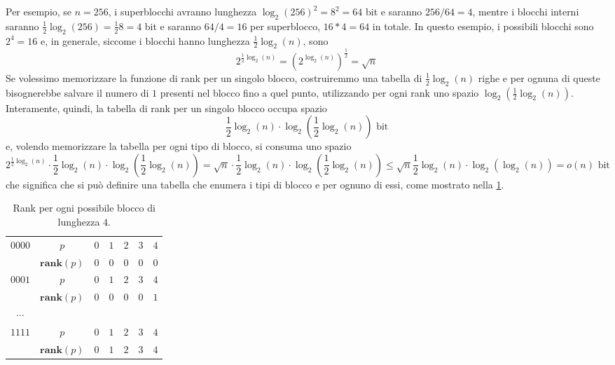 Per esempio, se $n = 256$, i superblocchi avranno lunghezza
$\log_2(256)^2 = 8^2 = 64$ bit e saranno $256/64 = 4$, mentre i
blocchi interni saranno $\frac{1}{2}\log_2(256) = \frac{1}{2}8 = 4$ bit e saranno
$64/4 = 16$ per superblocco, $16*4 = 64$ in totale.
In questo esempio, i possibili blocchi sono $2^4 = 16$ e, in generale,
siccome i blocchi hanno lunghezza $\frac{1}{2} \log_2(n)$, sono
$$
	2^{\frac{1}{2}\log_2(n)} = (2^{\log_2(n)})^{\frac{1}{2}} =  \sqrt{n}
$$
Se volessimo memorizzare la funzione di rank per un singolo blocco,
costruiremmo una tabella di $\frac{1}{2}\log_2(n)$ righe e per ognuna
di queste bisognerebbe salvare il numero di $1$ presenti nel blocco fino a quel punto,
utilizzando per ogni rank uno spazio $\log_2(\frac{1}{2}\log_2(n))$. Interamente, quindi,
la tabella di rank per un singolo blocco occupa spazio
$$
	\frac{1}{2}\log_2(n) \cdot \log_2(\frac{1}{2}\log_2(n)) \text{ bit}
$$
e, volendo memorizzare la tabella per ogni tipo di blocco, si consuma uno spazio
$$
	2^{\frac{1}{2}\log_2(n)} \cdot \frac{1}{2}\log_2(n) \cdot \log_2(\frac{1}{2}\log_2(n)) = \sqrt{n} \cdot \frac{1}{2}\log_2(n) \cdot \log_2(\frac{1}{2}\log_2(n))
	\leq \sqrt{n} \frac{1}{2}\log_2(n) \cdot \log_2(\log_2(n)) = o(n) \text{ bit}
$$
che significa che si può definire una tabella che enumera i tipi di blocco e per ognuno di
essi, come mostrato nella \cref{table:example_rank_block4}.

\begin{table}[!ht]
	\centering
	\begin{tabular}{|c|c|c|c|c|c|c|}
		\hline
		\multirow{2}{*}{$0000$} & $p$                & $0$ & $1$ & $2$ & $3$ & $4$ \\ \cline{2-7}
		                        & $\mathbf{rank}(p)$ & $0$ & $0$ & $0$ & $0$ & $0$ \\ \hline
		\multirow{2}{*}{$0001$} & $p$                & $0$ & $1$ & $2$ & $3$ & $4$ \\ \cline{2-7}
		                        & $\mathbf{rank}(p)$ & $0$ & $0$ & $0$ & $0$ & $1$ \\ \hline
		$\cdots$                &                    &     &     &     &     &     \\ \hline
		\multirow{2}{*}{$1111$} & $p$                & $0$ & $1$ & $2$ & $3$ & $4$ \\ \cline{2-7}
		                        & $\mathbf{rank}(p)$ & $0$ & $1$ & $2$ & $3$ & $4$ \\ \hline
	\end{tabular}
	\caption{Rank per ogni possibile blocco di lunghezza $4$.}
	\label{table:example_rank_block4}
\end{table}

